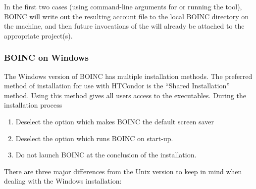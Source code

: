 In the first two cases (using command-line arguments for
 or running the  tool), BOINC
will write out the resulting account file to the local BOINC directory
on the machine, and then future invocations of the
 will already be attached to the appropriate
project(s).

\subsubsection{\label{sec:Backfill-BOINC-Windows}BOINC on Windows}

The Windows version of BOINC has multiple installation methods.
The preferred method of installation for use with HTCondor is the 
``Shared Installation'' method.
Using this method gives all users access to the executables.
During the installation process 
\begin{enumerate}
\item
Deselect the option which makes BOINC the default screen saver
\item
Deselect the option which runs BOINC on start-up.
\item
Do not launch BOINC at the conclusion of the installation.
\end{enumerate}

There are three major differences from the Unix version
to keep in mind when dealing with the Windows installation:

